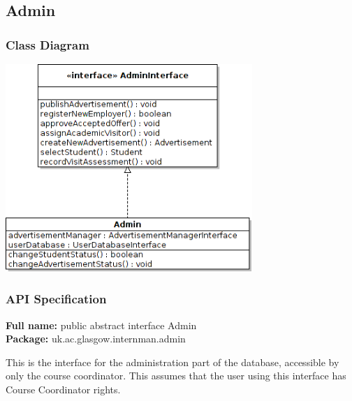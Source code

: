 \documentclass[11pt]{l3deliverable}
\begin{document}
\newpage

\subsection{Admin}

\subsubsection{Class Diagram}
\begin{centering}
  \includegraphics[width=0.7\textwidth]{adminClassDiagram.png}
\end{centering}
\subsubsection{API Specification}

\textbf{Full name:} public abstract interface Admin\\

\textbf{Package:} uk.ac.glasgow.internman.admin

This is the interface for the administration part of the database, accessible by
only the course coordinator.
This assumes that the user using this interface has Course Coordinator
rights.
\end{document}
